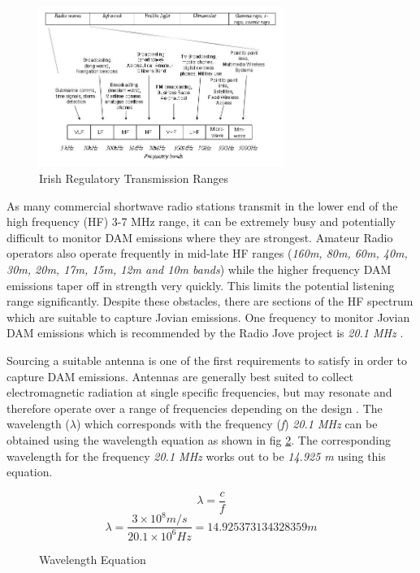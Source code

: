\documentclass[runningheads,a4paper]{llncs}
\begin{document}
%
\begin{figure}[here]
\centering
\includegraphics[width=8cm]{images/06}
\caption{Irish Regulatory Transmission Ranges \citep{comreg14}}
\label{fig:irish_electromagnetic_transmission_ranges}
\end{figure}
%

As many commercial shortwave radio stations transmit in the lower end of the high frequency (\gls{HF}) 3-7 MHz range, it can be extremely busy and potentially difficult to monitor \gls{DAM} emissions where they are strongest. Amateur Radio operators also operate frequently in mid-late \gls{HF} ranges (\textit{160m, 80m, 60m, 40m, 30m, 20m, 17m, 15m, 12m and 10m bands}) while the higher frequency \gls{DAM} emissions taper off in strength very quickly. This limits the potential listening range significantly. Despite these obstacles, there are sections of the \gls{HF} spectrum which are suitable to capture Jovian emissions. One frequency to monitor Jovian \gls{DAM} emissions which is recommended by the Radio Jove project is \textit{20.1 MHz} \citep{nasa12}. 

Sourcing a suitable antenna is one of the first requirements to satisfy in order to capture \gls{DAM} emissions. Antennas are generally best suited to collect electromagnetic radiation at single specific frequencies, but may resonate and therefore operate over a range of frequencies depending on the design \citep{nasa12}. The wavelength ($\lambda$) which corresponds with the frequency (\textit{f}) \textit{20.1 MHz} can be obtained using the wavelength equation as shown in fig \ref{fig:wavelength_equation}. The corresponding wavelength for the frequency \textit{20.1 MHz} works out to be \textit{14.925 m} using this equation.

%
\begin{figure}[here]
  \centering
  \begin{equation}  	
    \lambda = \frac{c}{f}
  \end{equation}
  \begin{equation}
    \lambda = \frac{3\times10^8 m/s}{20.1\times10^6 Hz} = 14.925373134328359 m
  \end{equation}
  \caption{Wavelength Equation}
  \label{fig:wavelength_equation}
\end{figure}
%
\end{document}
